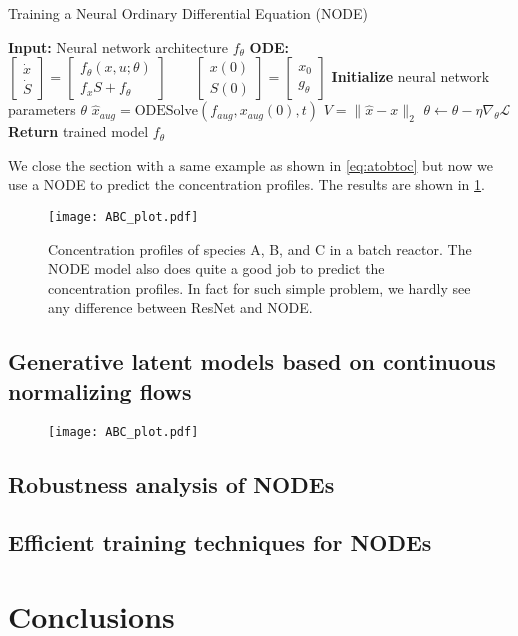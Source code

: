 \documentclass[fontsize=11pt]{article}
\newcommand{\norm}[1]{\lVert #1 \rVert}
\theoremstyle{definition}
\begin{document}
\begin{algorithm}[h]
\caption{Training a Neural Ordinary Differential Equation (NODE)}
\label{alg:NODE}
\begin{algorithmic}[1]
\State \textbf{Input:} Neural network architecture $f_{\theta}$
\State \textbf{ODE:} 
$
    \begin{bmatrix} \dot{x} \\ \dot{S} \end{bmatrix} = 
    \begin{bmatrix} f_\theta(x, u; \theta) \\ f_xS + f_{\theta} \end{bmatrix}
    \qquad
    \begin{bmatrix} x(0) \\ S(0) \end{bmatrix} =
    \begin{bmatrix} x_0 \\ g_\theta \end{bmatrix}
    \label{eq:augsens}
$
\State \textbf{Initialize} neural network parameters $\theta$
\Repeat
    \State $\hat{x}_{aug} = \text{ODESolve}(f_{aug}, x_{aug}(0), t)$
    \State $V = \norm{\hat{x} - x}_{2}$
    \State $\theta \leftarrow \theta - \eta \nabla_{\theta} \mathcal{L}$
\State \textbf{Return} trained model $f_{\theta}$
\end{algorithmic}
\end{algorithm}
We close the section with a same example as shown in \cref{eq:atobtoc} but now
we use a NODE to predict the concentration profiles. The results are shown in
\cref{fig:node}.

\begin{figure}[h]
    \centering
    \texttt{[image: ABC\_plot.pdf]} 
    \caption{Concentration profiles of species A, B, and C in a batch reactor. The
    NODE model also does quite a good job to predict the concentration profiles. 
    In fact for such simple problem, we hardly see any difference between ResNet and NODE.}
    \label{fig:node}
\end{figure}

\subsection{Generative latent models based on continuous normalizing flows}

\begin{figure}[h]
    \centering
    \texttt{[image: ABC\_plot.pdf]} 
\end{figure}

\subsection{Robustness analysis of NODEs}

\subsection{Efficient training techniques for NODEs}

\section{Conclusions}


\newpage
\FloatBarrier


\end{document}

